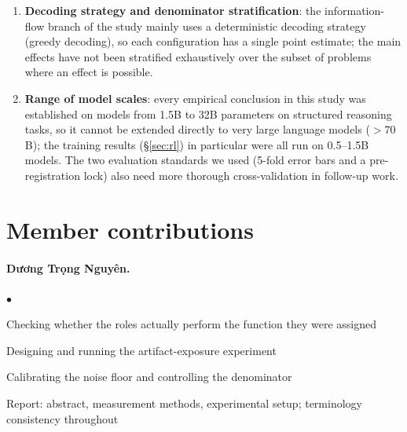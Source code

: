 \documentclass[11pt,a4paper]{article}
\begin{document}
\begin{enumerate}
      region of the capability-gap regression currently has a single empirical point ($+7.7$ points
      at a gap of zero) and does not have the statistical sensitivity to be established firmly on
      MBPP; the sign-change threshold $g^\ast$ has no parametric confidence interval attached.
\item \textbf{Decoding strategy and denominator stratification}: the information-flow branch of the
      study mainly uses a deterministic decoding strategy (greedy decoding), so each configuration
      has a single point estimate; the main effects have not been stratified exhaustively over the
      subset of problems where an effect is possible.
\item \textbf{Range of model scales}: every empirical conclusion in this study was established on
      models from 1.5B to 32B parameters on structured reasoning tasks, so it cannot be extended
      directly to very large language models ($>70$B); the training results (\S\ref{sec:rl}) in
      particular were all run on 0.5--1.5B models. The two evaluation standards we used (5-fold
      error bars and a pre-registration lock) also need more thorough cross-validation in follow-up
      work.
\end{enumerate}


\clearpage
\section*{Member contributions}

\newenvironment{ddgop}%
  {\begin{list}{$\bullet$}{%
     \setlength{\leftmargin}{1.4em}\setlength{\labelwidth}{0.8em}%
     \setlength{\itemsep}{1pt}\setlength{\parsep}{0pt}\setlength{\topsep}{3pt}}}%
  {\end{list}}

\paragraph{Dương Trọng Nguyên.}
\begin{ddgop}
\item Checking whether the roles actually perform the function they were assigned
\item Designing and running the artifact-exposure experiment
\item Calibrating the noise floor and controlling the denominator
\item Report: abstract, measurement methods, experimental setup; terminology consistency throughout
\end{ddgop}
\end{document}

